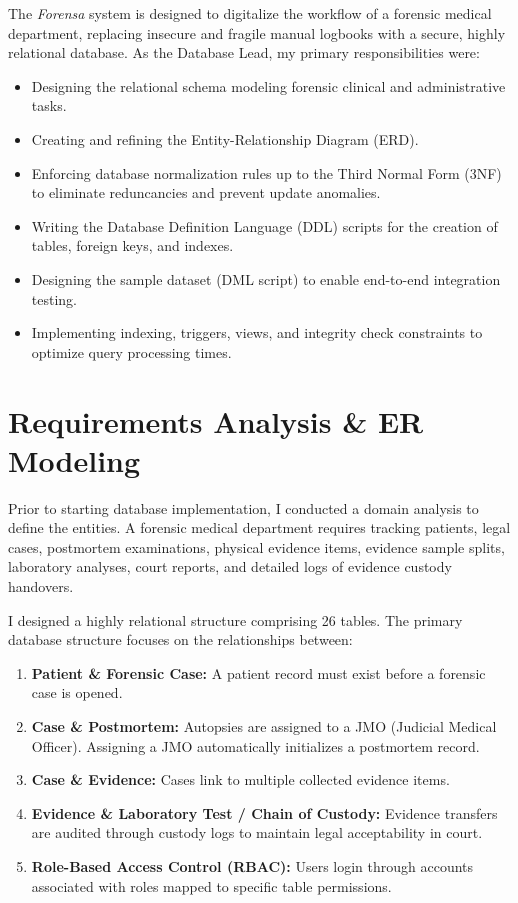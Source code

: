 \documentclass[12pt,a4paper]{article}
\begin{document}
The \textit{Forensa} system is designed to digitalize the workflow of a forensic medical department, replacing insecure and fragile manual logbooks with a secure, highly relational database. As the Database Lead, my primary responsibilities were:
\begin{itemize}
    \item Designing the relational schema modeling forensic clinical and administrative tasks.
    \item Creating and refining the Entity-Relationship Diagram (ERD).
    \item Enforcing database normalization rules up to the Third Normal Form (3NF) to eliminate reduncancies and prevent update anomalies.
    \item Writing the Database Definition Language (DDL) scripts for the creation of tables, foreign keys, and indexes.
    \item Designing the sample dataset (DML script) to enable end-to-end integration testing.
    \item Implementing indexing, triggers, views, and integrity check constraints to optimize query processing times.
\end{itemize}

\section{Requirements Analysis \& ER Modeling}
Prior to starting database implementation, I conducted a domain analysis to define the entities. A forensic medical department requires tracking patients, legal cases, postmortem examinations, physical evidence items, evidence sample splits, laboratory analyses, court reports, and detailed logs of evidence custody handovers.

I designed a highly relational structure comprising 26 tables. The primary database structure focuses on the relationships between:
\begin{enumerate}
    \item \textbf{Patient \& Forensic Case:} A patient record must exist before a forensic case is opened.
    \item \textbf{Case \& Postmortem:} Autopsies are assigned to a JMO (Judicial Medical Officer). Assigning a JMO automatically initializes a postmortem record.
    \item \textbf{Case \& Evidence:} Cases link to multiple collected evidence items.
    \item \textbf{Evidence \& Laboratory Test / Chain of Custody:} Evidence transfers are audited through custody logs to maintain legal acceptability in court.
    \item \textbf{Role-Based Access Control (RBAC):} Users login through accounts associated with roles mapped to specific table permissions.
\end{enumerate}
\end{document}
